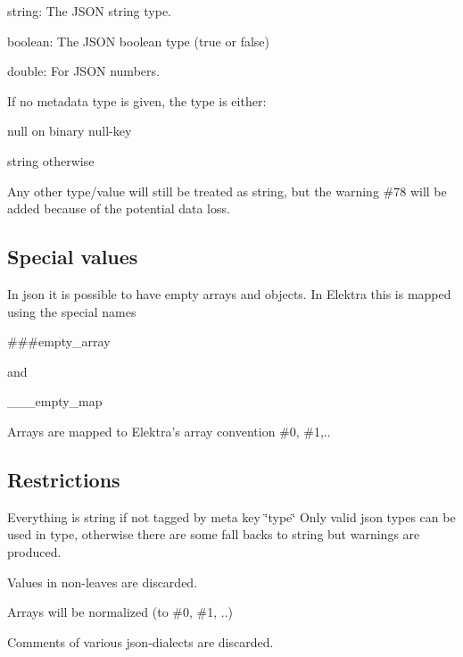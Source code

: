\begin{DoxyItemize}
\item {\ttfamily string}\+: The J\+S\+O\+N string type.
\item {\ttfamily boolean}\+: The J\+S\+O\+N boolean type (true or false)
\item {\ttfamily double}\+: For J\+S\+O\+N numbers.
\end{DoxyItemize}

If no metadata {\ttfamily type} is given, the type is either\+:


\begin{DoxyItemize}
\item {\ttfamily null} on binary null-\/key
\item {\ttfamily string} otherwise
\end{DoxyItemize}

Any other type/value will still be treated as string, but the warning {\ttfamily \#78} will be added because of the potential data loss.

\subsection*{Special values}

In json it is possible to have empty arrays and objects. In Elektra this is mapped using the special names \begin{DoxyVerb}    ###empty_array
\end{DoxyVerb}


and \begin{DoxyVerb}    ___empty_map
\end{DoxyVerb}


Arrays are mapped to Elektra's array convention \#0, \#1,..

\subsection*{Restrictions}


\begin{DoxyItemize}
\item Everything is string if not tagged by meta key \char`\"{}type\char`\"{} Only valid json types can be used in type, otherwise there are some fall backs to string but warnings are produced.
\item Values in non-\/leaves are discarded.
\item Arrays will be normalized (to \#0, \#1, ..)
\item Comments of various json-\/dialects are discarded.
\end{DoxyItemize}

